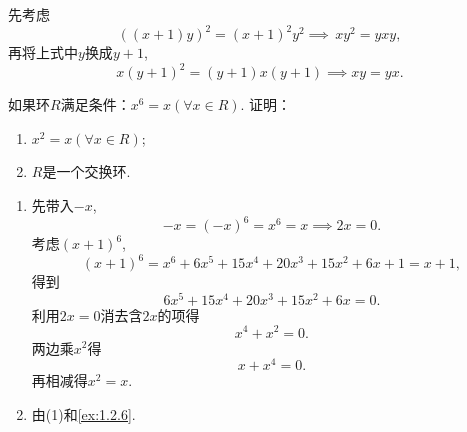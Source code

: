 \begin{solution}
    先考虑
    \[
        ((x + 1)y)^2 = (x + 1)^2y^2 \implies\, xy^2 = yxy,
    \]
    再将上式中$y$换成$y + 1$,
    \[
        x(y + 1)^2 = (y + 1)x(y + 1) \implies xy = yx.
    \]
\end{solution}

\begin{problem}
    如果环$R$满足条件：$x^6 = x (\forall x \in R)$. 证明：
\begin{enumerate}[(1)]
    \item $x^2 = x (\forall x \in R)$;
    \item $R$是一个交换环.
\end{enumerate}
\end{problem}

\begin{solution}
\begin{enumerate}[(1)]
    \item 先带入$-x$,
\[
    -x = (-x)^6 = x^6 = x \implies 2x = 0.
\]
    考虑$(x + 1)^6$,
\[
    (x + 1)^6 = x^6 + 6x^5 + 15x^4 + 20x^3 + 15x^2 + 6x + 1 = x + 1,
\]
得到
\[
    6x^5 + 15x^4 + 20x^3 + 15x^2 + 6x = 0.
\]
利用$2x = 0$消去含$2x$的项得
\[
    x^4 + x^2 = 0.
\]
两边乘$x^2$得
\[
    x + x^4 = 0.
\]
再相减得$x^2 = x$.
    \item 由(1)和\ref{ex:1.2.6}.
\end{enumerate}
\end{solution}